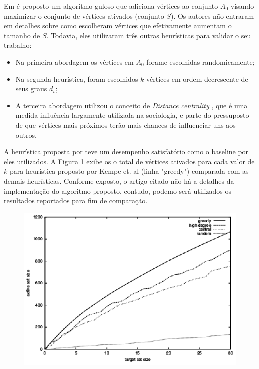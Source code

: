 \documentclass[12pt]{article}
\begin{document}
Em \cite{kempe2003maximizing} é proposto um algoritmo guloso que adiciona vértices ao conjunto $A_{0}$ visando maximizar o conjunto de vértices ativados (conjunto $S$). Os autores não entraram em detalhes sobre como escolheram vértices que efetivamente aumentam o tamanho de $S$. Todavia, eles utilizaram três outras heurísticas para validar o seu trabalho:

\begin{itemize}
	\item Na primeira abordagem os vértices em $A_{0}$ forame escolhidas randomicamente;
	\item Na segunda heurística, foram escolhidos $k$ vértices em ordem decrescente de seus graus $d_{v}$;
	\item A terceira abordagem utilizou o conceito de \textit{Distance centrality} \cite{scott2012social}, que é uma  medida influência largamente utilizada na sociologia, e parte do pressuposto de que vértices mais próximos terão mais chances de influenciar uns aos outros.
\end{itemize}

A heurística proposta por \cite{kempe2003maximizing}	teve um desempenho satisfatório como o baseline por eles utilizados. A Figura \ref{fig:baseline} exibe os o total de vértices ativados para cada valor de $k$ para heurística proposto por Kempe et. al (linha "greedy") comparada com as demais heurísticas. Conforme exposto, o artigo citado não há a detalhes da implementação do algoritmo proposto, contudo, podemo será utilizados os resultados reportados para fim de comparação.

\begin{figure}[!t]
	\centering
	\includegraphics[width=5.0in]{../img/grafico_baseline.eps}
	\label{fig:baseline}
	
\end{figure}
 
\end{document}
